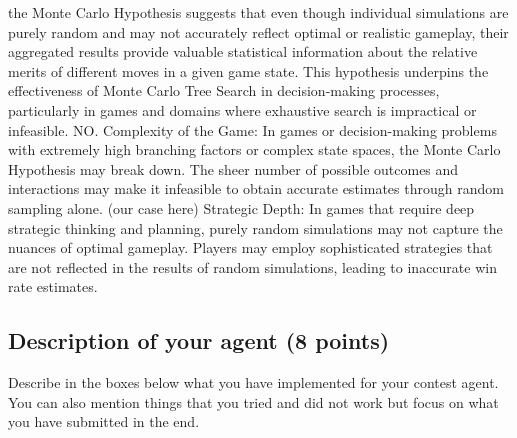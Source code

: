 \documentclass[11pt,a4paper]{report}
\begin{document}
\begin{answers}[15cm]
    the Monte Carlo Hypothesis suggests that even though individual simulations are purely random and may not accurately reflect optimal or realistic gameplay, their aggregated results provide valuable statistical information about the relative merits of different moves in a given game state. This hypothesis underpins the effectiveness of Monte Carlo Tree Search in decision-making processes, particularly in games and domains where exhaustive search is impractical or infeasible.
    NO.
    Complexity of the Game: In games or decision-making problems with extremely high branching factors or complex state spaces, the Monte Carlo Hypothesis may break down. The sheer number of possible outcomes and interactions may make it infeasible to obtain accurate estimates through random sampling alone.
    (our case here)
    Strategic Depth: In games that require deep strategic thinking and planning, purely random simulations may not capture the nuances of optimal gameplay. Players may employ sophisticated strategies that are not reflected in the results of random simulations, leading to inaccurate win rate estimates.

\end{answers}


\newpage
\subsection{Description of your agent (8 points)}
Describe in the boxes below what you have implemented for your contest agent. You can also mention things that you tried and did not work but focus on what you have submitted in the end.
\end{document}
